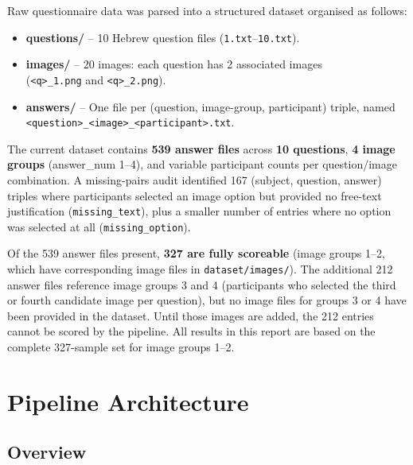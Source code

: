 \documentclass[12pt,a4paper]{article}
\begin{document}
Raw questionnaire data was parsed into a structured dataset organised as follows:

\begin{itemize}[noitemsep]
  \item \textbf{questions/} -- 10 Hebrew question files (\texttt{1.txt}--\texttt{10.txt}).
  \item \textbf{images/} -- 20 images: each question has 2 associated images\\
        (\texttt{<q>\_{1}.png} and \texttt{<q>\_{2}.png}).
  \item \textbf{answers/} -- One file per (question, image-group, participant) triple,
        named \texttt{<question>\_<image>\_<participant>.txt}.
\end{itemize}

The current dataset contains \textbf{539 answer files} across \textbf{10 questions},
\textbf{4 image groups} (answer\_num 1--4), and variable participant counts per
question/image combination.  A missing-pairs audit identified 167 (subject, question,
answer) triples where participants selected an image option but provided no free-text
justification (\texttt{missing\_text}), plus a smaller number of entries where no option
was selected at all (\texttt{missing\_option}).

\medskip
\begin{tcolorbox}[title=Data Completeness Note,colback=yellow!8,colframe=orange!60!black]
Of the 539 answer files present, \textbf{327 are fully scoreable} (image groups 1--2,
which have corresponding image files in \texttt{dataset/images/}).  The additional
212 answer files reference image groups 3 and 4 (participants who selected the third
or fourth candidate image per question), but no image files for groups 3 or 4 have
been provided in the dataset.  Until those images are added, the 212 entries cannot
be scored by the pipeline.  All results in this report are based on the complete
327-sample set for image groups 1--2.
\end{tcolorbox}

\section{Pipeline Architecture}

\subsection{Overview}
\end{document}
